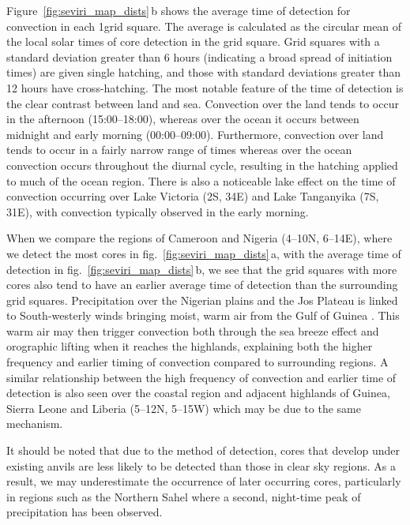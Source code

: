 Figure~\ref{fig:seviri_map_dists}\,b shows the average time of detection for convection in each 1\textdegree grid square. 
The average is calculated as the circular mean of the local solar times of core detection in the grid square. 
Grid squares with a standard deviation greater than 6 hours (indicating a broad spread of initiation times) are given single hatching, and those with standard deviations greater than 12 hours have cross-hatching. 
The most notable feature of the time of detection is the clear contrast between land and sea. 
Convection over the land tends to occur in the afternoon (15:00--18:00), whereas over the ocean it occurs between midnight and early morning (00:00--09:00). 
Furthermore, convection over land tends to occur in a fairly narrow range of times whereas over the ocean convection occurs throughout the diurnal cycle, resulting in the hatching applied to much of the ocean region. 
There is also a noticeable lake effect on the time of convection occurring over Lake Victoria (2\textdegree S, 34\textdegree E) and Lake Tanganyika (7\textdegree S, 31\textdegree E), with convection typically observed in the early morning.

When we compare the regions of Cameroon and Nigeria (4--10\textdegree N, 6--14\textdegree E), where we detect the most cores in fig.~\ref{fig:seviri_map_dists}\,a, with the average time of detection in fig.~\ref{fig:seviri_map_dists}\,b, we see that the grid squares with more cores also tend to have an earlier average time of detection than the surrounding grid squares. 
Precipitation over the Nigerian plains and the Jos Plateau is linked to South-westerly winds bringing moist, warm air from the Gulf of Guinea \citep{vondou_seasonal_2010}. 
This warm air may then trigger convection both through the sea breeze effect and orographic lifting when it reaches the highlands, explaining both the higher frequency and earlier timing of convection compared to surrounding regions. 
A similar relationship between the high frequency of convection and earlier time of detection is also seen over the coastal region and adjacent highlands of Guinea, Sierra Leone and Liberia (5--12\textdegree N, 5--15\textdegree W) which may be due to the same mechanism.

It should be noted that due to the method of detection, cores that develop under existing anvils are less likely to be detected than those in clear sky regions. 
As a result, we may underestimate the occurrence of later occurring cores, particularly in regions such as the Northern Sahel where a second, night-time peak of precipitation has been observed.

